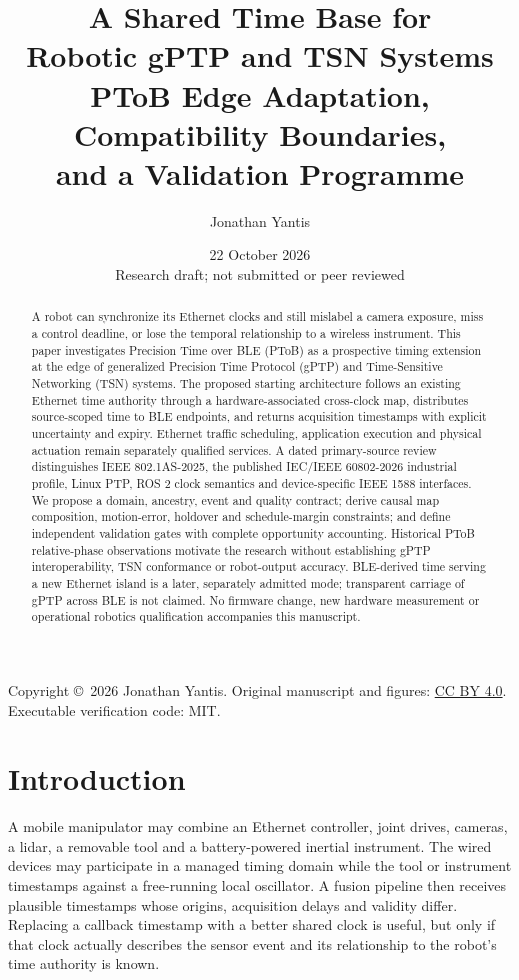 \documentclass[11pt,letterpaper]{article}
\begin{document}
\title{\vspace{-1.2em}A Shared Time Base for\\Robotic gPTP and TSN Systems\\[5pt]\large PToB Edge Adaptation, Compatibility Boundaries,\\and a Validation Programme}
\author{Jonathan Yantis}
\date{22 October 2026\\\small Research draft; not submitted or peer reviewed}
\maketitle
\begin{abstract}
A robot can synchronize its Ethernet clocks and still mislabel a camera exposure, miss a control deadline, or lose the temporal relationship to a wireless instrument. This paper investigates Precision Time over BLE (PToB) as a prospective timing extension at the edge of generalized Precision Time Protocol (gPTP) and Time-Sensitive Networking (TSN) systems. The proposed starting architecture follows an existing Ethernet time authority through a hardware-associated cross-clock map, distributes source-scoped time to BLE endpoints, and returns acquisition timestamps with explicit uncertainty and expiry. Ethernet traffic scheduling, application execution and physical actuation remain separately qualified services. A dated primary-source review distinguishes IEEE 802.1AS-2025, the published IEC/IEEE 60802-2026 industrial profile, Linux PTP, ROS 2 clock semantics and device-specific IEEE 1588 interfaces. We propose a domain, ancestry, event and quality contract; derive causal map composition, motion-error, holdover and schedule-margin constraints; and define independent validation gates with complete opportunity accounting. Historical PToB relative-phase observations motivate the research without establishing gPTP interoperability, TSN conformance or robot-output accuracy. BLE-derived time serving a new Ethernet island is a later, separately admitted mode; transparent carriage of gPTP across BLE is not claimed. No firmware change, new hardware measurement or operational robotics qualification accompanies this manuscript.
\end{abstract}
\noindent\small Copyright \copyright\ 2026 Jonathan Yantis. Original manuscript and figures: \href{https://creativecommons.org/licenses/by/4.0/}{CC BY 4.0}. Executable verification code: MIT.\normalsize

\section{Introduction}
A mobile manipulator may combine an Ethernet controller, joint drives, cameras, a lidar, a removable tool and a battery-powered inertial instrument. The wired devices may participate in a managed timing domain while the tool or instrument timestamps against a free-running local oscillator. A fusion pipeline then receives plausible timestamps whose origins, acquisition delays and validity differ. Replacing a callback timestamp with a better shared clock is useful, but only if that clock actually describes the sensor event and its relationship to the robot's time authority is known.
\end{document}
